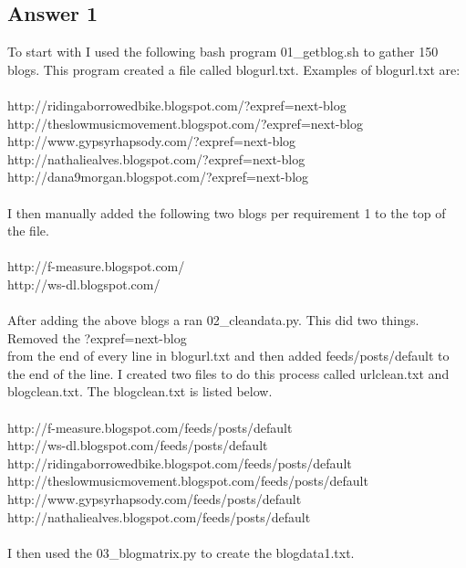 \documentclass[10pt,letterpaper]{article}
\begin{document}
\subsection{Answer 1}
To start with I used the following bash program 01\_getblog.sh to gather 150 blogs.  This program created a file called blogurl.txt.  Examples of blogurl.txt are:\\ 
\\
http://ridingaborrowedbike.blogspot.com/{?}expref{=}next-blog\\
http://theslowmusicmovement.blogspot.com/{?}expref{=}next-blog\\
http://www.gypsyrhapsody.com/{?}expref{=}next-blog\\
http://nathaliealves.blogspot.com/{?}expref{=}next-blog\\
http://dana9morgan.blogspot.com/{?}expref{=}next-blog\\
\\
I then manually added the following two blogs per requirement 1 to the top of the file.\\
\\
http://f-measure.blogspot.com/\\
http://ws-dl.blogspot.com/\\
\\
After adding the above blogs a ran 02\_cleandata.py.  This did two things.  Removed the {?}expref{=}next-blog\\ from the end of every line in blogurl.txt and then added
feeds/posts/default to the end of the line.  I created two files to do this process called urlclean.txt and blogclean.txt.  The blogclean.txt is listed below.\\
\\
http://f-measure.blogspot.com/feeds/posts/default\\
http://ws-dl.blogspot.com/feeds/posts/default\\
http://ridingaborrowedbike.blogspot.com/feeds/posts/default\\
http://theslowmusicmovement.blogspot.com/feeds/posts/default\\
http://www.gypsyrhapsody.com/feeds/posts/default\\
http://nathaliealves.blogspot.com/feeds/posts/default\\
\\
I then used the 03\_blogmatrix.py to create the blogdata1.txt.\\
\end{document}
